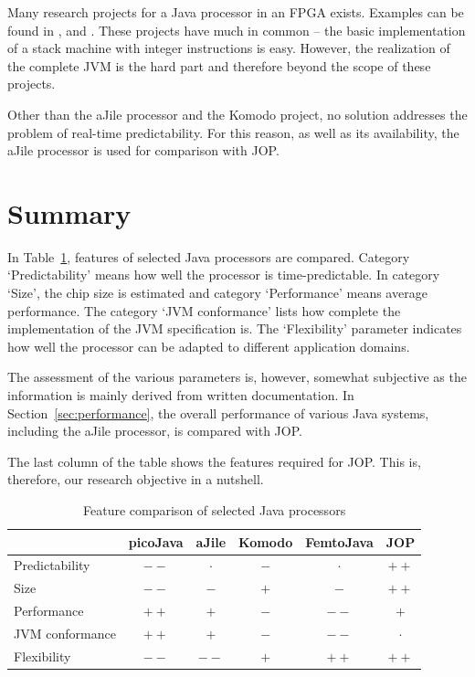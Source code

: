 Many research projects for a Java processor in an FPGA exists.
Examples can be found in \cite{Femto01}, \cite{Kim2000} and
\cite{368445}. These projects have much in common -- the basic
implementation of a stack machine with integer instructions is easy.
However, the realization of the complete JVM is the hard part and
therefore beyond the scope of these projects.

Other than the aJile processor and the Komodo project, no solution
addresses the problem of real-time predictability. For this reason,
as well as its availability, the aJile processor is used for
comparison with JOP.

\section{Summary}
\label{sec:related:summary}

In Table~\ref{tab:related:plus:minus}, features of selected Java
processors are compared. Category `Predictability' means how well
the processor is time-predictable. In category `Size', the chip size
is estimated and category `Performance' means average performance.
The category `JVM conformance' lists how complete the implementation
of the JVM specification \cite{jvm} is. The `Flexibility' parameter
indicates how well the processor can be adapted to different
application domains.

The assessment of the various parameters is, however, somewhat
subjective as the information is mainly derived from written
documentation. In Section~\ref{sec:performance}, the overall
performance of various Java systems, including the aJile processor,
is compared with JOP.

The last column of the table shows the features required for JOP.
This is, therefore, our research objective in a nutshell.

\begin{table}[htp]
    \centering
    \begin{tabular}{lccccc}
        \toprule
                        & picoJava & aJile   & Komodo  & FemtoJava & JOP     \\
        \midrule
        Predictability  & $--$     & $\cdot$ & $-$     & $\cdot$   & $++$    \\
        Size            & $--$     & $-$     & $+$     & $-$       & $++$    \\
        Performance     & $++$     & $+$     & $-$     & $--$      & $+$     \\
        JVM conformance & $++$     & $+$     & $-$     & $--$      & $\cdot$ \\
        Flexibility     & $--$     & $--$    & $+$     & $++$      & $++$    \\
        \bottomrule
    \end{tabular}
    \caption{Feature comparison of selected Java processors}
    \label{tab:related:plus:minus}
\end{table}

